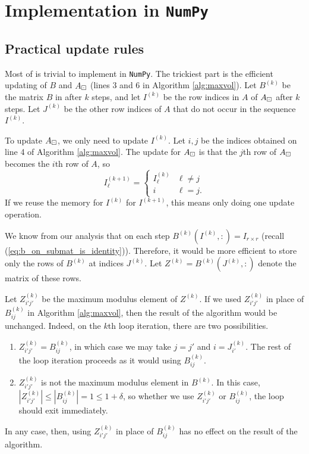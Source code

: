 \documentclass{article}
\begin{document}
	\section{Implementation in \texttt{NumPy}}
	
	\subsection{Practical update rules}
	Most of \maxvol{} is trivial to implement in \texttt{NumPy}. The trickiest part is the efficient updating of $B$ and $A_\boxdot$ (lines 3 and 6 in Algorithm \ref{alg:maxvol}). Let $B^{(k)}$ be the matrix $B$ in \maxvol{} after $k$ steps, and let $I^{(k)}$ be the row indices in $A$ of $A_\boxdot$ after $k$ steps. Let $J^{(k)}$ be the other row indices of $A$ that do not occur in the sequence $I^{(k)}$. 
	
	
	
	To update $A_\boxdot$, we only need to update $I^{(k)}$. Let $i,j$ be the indices obtained on line 4 of Algorithm \ref{alg:maxvol}. The update for $A_\boxdot$ is that the $j$th row of $A_\boxdot$ becomes the $i$th row of $A$, so
	\begin{equation}
		I^{(k+1)}_\ell = \begin{cases}
			I^{(k)}_\ell & \ell \ne j \\
			i & \ell = j.
		\end{cases}
	\end{equation}
	If we reuse the memory for $I^{(k)}$ for $I^{(k+1)}$, this means only doing one update operation. 
	
	
	We know from our analysis that on each step $B^{(k)}\left(I^{(k)},:\right) = I_{r\times r}$ (recall (\ref{eq:b_on_submat_is_identity})). Therefore, it would be more efficient to store only the rows of $B^{(k)}$ at indices $J^{(k)}$. Let $Z^{(k)} = B^{(k)}\left(J^{(k)},:\right)$ denote the matrix of these rows.
	
	Let $Z^{(k)}_{i'j'}$ be the maximum modulus element of $Z^{(k)}$. If we used $Z^{(k)}_{i'j'}$ in place of $B^{(k)}_{ij}$ in Algorithm \ref{alg:maxvol}, then the result of the algorithm would be unchanged. Indeed, on the $k$th loop iteration, there are two possibilities.
	\begin{enumerate}
		\item $Z^{(k)}_{i'j'} = B^{(k)}_{ij}$, in which case we may take $j = j'$ and $i = J^{(k)}_{i'}$. The rest of the loop iteration proceeds as it would using $B^{(k)}_{ij}$.
		\item $Z^{(k)}_{i'j'}$ is not the maximum modulus element in $B^{(k)}$. In this case, $\left|Z^{(k)}_{i'j'}\right| \le \left|B^{(k)}_{ij}\right| = 1 \le 1 + \delta$, so whether we use $Z^{(k)}_{i'j'}$ or $B^{(k)}_{ij}$, the loop should exit immediately.
	\end{enumerate}
	In any case, then, using $Z^{(k)}_{i'j'}$ in place of $B^{(k)}_{ij}$ has no effect on the result of the algorithm.
	
\end{document}
